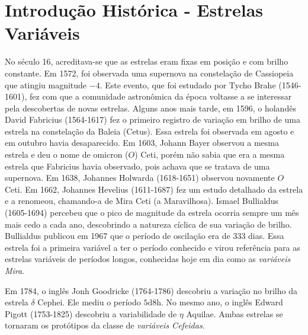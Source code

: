 


\section{Introdução Histórica - Estrelas Variáveis}


No século 16, acreditava-se que as estrelas eram fixas em posição e com brilho constante. Em 1572, foi observada uma supernova na constelação de Cassiopeia que atingiu magnitude $-4$. Este evento, que foi estudado por Tycho Brahe (1546-1601), fez com que a comunidade astronômica da época voltasse a se interessar pela descobertas de novas estrelas. Alguns anos mais tarde, em 1596, o holandês David Fabricius (1564-1617) fez o primeiro registro de variação em brilho de uma estrela na constelação da Baleia (Cetus).  Essa estrela foi observada em agosto e em outubro havia desaparecido. Em 1603, Johann Bayer observou a mesma estrela e deu o nome de omicron ($O$) Ceti, porém não sabia que era a mesma estrela que Fabricius havia observado, pois achava que se tratava de uma supernova. Em 1638, Johannes Holwarda (1618-1651) observou novamente $O$ Ceti. Em 1662, Johannes Hevelius (1611-1687) fez um estudo detalhado da estrela e a renomeou, chamando-a de Mira Ceti (a Maravilhosa). Ismael Bullialdus (1605-1694) percebeu que o pico de magnitude da estrela ocorria sempre um mês mais cedo a cada ano, descobrindo a natureza cíclica de sua variação de brilho. Bullialdus publicou em 1967 que o período de oscilação era de 333 dias. Essa estrela foi a primeira variável a ter o período conhecido e virou referência para as estrelas variáveis de períodos longos, conhecidas hoje em dia como as \textit{variáveis Mira}.

Em 1784, o inglês Jonh Goodricke (1764-1786) descobriu a variação no brilho da estrela $\delta$ Cephei. Ele mediu o período $5\si{\day}8\si{\hour}$. No mesmo ano, o inglês Edward Pigott (1753-1825) descobriu a variabilidade de $\eta$ Aquilae. Ambas estrelas se tornaram os protótipos da classe de \textit{variáveis Cefeidas}.

